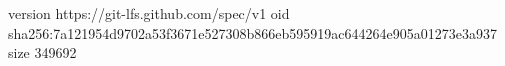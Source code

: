 version https://git-lfs.github.com/spec/v1
oid sha256:7a121954d9702a53f3671e527308b866eb595919ac644264e905a01273e3a937
size 349692
